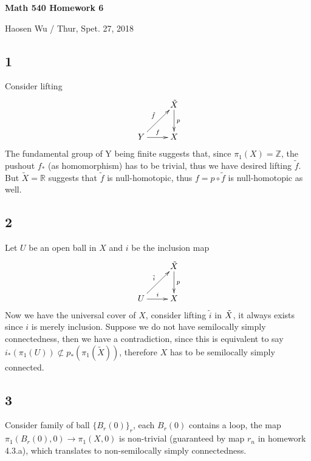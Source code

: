 \documentclass[11pt]{article}
\def\Z{{\mathbb Z}}
\def\R{{\mathbb R}}
\theoremstyle{remark}
\begin{document}
\begin{center}
    \begin{Large} {\bf Math 540 Homework 6}\\
    \end{Large}
    Haosen Wu  / Thur, Spet. 27, 2018
\end{center}

\subsection*{1}
Consider lifting 
    \[
    \xymatrix{
    & & \Tilde{X} \ar[d]^{p}&  \\
    & Y \ar[r]^{f}\ar[ur]^{\Tilde{f}} & X
    }
    \]
The fundamental group of Y being finite suggests that, since $\pi_1(X)=\Z$, the pushout $f_*$ (as homomorphism) has to be trivial, thus we have desired lifting $\tilde{f}$. But $\tilde{X}=\R$ suggests that $\tilde{f}$ is null-homotopic, thus $f=p\circ \tilde{f}$ is null-homotopic as well. 

\subsection*{2}
Let $U$ be an open ball in $X$ and $i$ be the inclusion map
    \[
    \xymatrix{
    & & \Tilde{X} \ar[d]^{p}&  \\
    & U \ar[r]^{i}\ar[ur]^{\Tilde{i}} & X
    }
    \]
Now we have the universal cover of $X$, consider lifting $\tilde{i}$ in $\Tilde{X}$, it always exists since $i$ is merely inclusion. Suppose we do not have semilocally simply connectedness, then we have a contradiction, since this is equivalent to say $i_*(\pi_1(U)) \not\subset p_*(\pi_1(\tilde{X}))$, therefore $X$ has to be semilocally simply connected.

\subsection*{3}
Consider family of ball $\{B_r(0)\}_r$, each $B_r(0)$ contains a loop, the map $\pi_1(B_r(0),0)\rightarrow\pi_1(X,0)$ is non-trivial (guaranteed by map $r_n$ in homework 4.3.a),  which translates to non-semilocally simply connectedness.    
\end{document}

